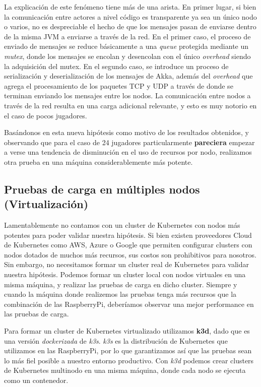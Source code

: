 La explicación de este fenómeno tiene más de una arista. En primer lugar, si bien la comunicación entre actores a nivel código es transparente ya sea un único nodo o varios, no es despreciable
el hecho de que los mensajes pasan de enviarse dentro de la misma JVM a enviarse a través de la red. En el primer caso, el proceso de enviado de mensajes se reduce básicamente a una \textit{queue}
protegida mediante un \textit{mutex}, donde los mensajes se encolan y desencolan con el único \textit{overhead} siendo la adquisición del mutex.
En el segundo caso, se introduce un proceso de serialización y deserialización de los mensajes de Akka, además del \textit{overhead} que agrega el procesamiento de los paquetes
TCP y UDP a través de donde se terminan enviando los mensajes entre los nodos. La comunicación entre nodos a través de la red resulta en una carga adicional relevante, y esto es muy notorio
en el caso de pocos jugadores.

Basándonos en esta nueva hipótesis como motivo de los resultados obtenidos, y observando que para el caso de 24 jugadores particularmente \textbf{pareciera} empezar a verse una tendencia de disminución
en el uso de recursos por nodo, realizamos otra prueba en una máquina considerablemente más potente.

\subsection{Pruebas de carga en múltiples nodos (Virtualización)}
\label{sec:virtualization}

\noindent Lamentablemente no contamos con un cluster de Kubernetes con nodos más potentes para poder validar nuestra hipótesis. Si bien existen proveedores Cloud de Kubernetes como AWS, Azure o Google que
permiten configurar clusters con nodos dotados de muchos más recursos, sus costos son prohibitivos para nosotros. Sin embargo, no necesitamos formar un cluster real de Kubernetes para validar nuestra hipótesis.
Podemos formar un cluster local con nodos virtuales en una misma máquina, y realizar las pruebas de carga en dicho cluster. Siempre y cuando la máquina donde realizemos las pruebas tenga más recursos que la combinación
de las RaspberryPi, deberíamos observar una mejor performance en las pruebas de carga.

Para formar un cluster de Kubernetes virtualizado utilizamos \textbf{k3d}, dado que es una versión \textit{dockerizada} de \textit{k3s}. \textit{k3s} es la distribución de Kubernetes que utilizamos en las RaspberryPi, por
lo que garantizamos así que las pruebas sean lo más fiel posible a nuestro entorno productivo. Con \textit{k3d} podemos crear clusters de Kubernetes multinodo en una misma máquina, donde cada nodo se ejecuta como un contenedor.

